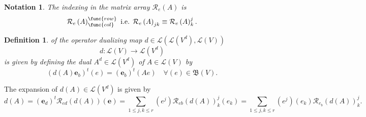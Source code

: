 \documentclass[aps,preprint]{revtex4}
\newtheorem{definition}[theorem]{Definition}
\newtheorem{notation}[theorem]{Notation}
\begin{document}
\begin{notation}
The indexing in the matrix array $\mathcal{R}_{e}\left( A\right) $ is 
\begin{equation}
\mathcal{R}_{e}\left( A\right) _{\func{col}}^{\func{row}}\text{ i.e. }%
\mathcal{R}_{e}\left( A\right) _{jk}\equiv \mathcal{R}_{e}\left( A\right)
_{k}^{j}.
\end{equation}
\end{notation}

\begin{definition}
of the operator dualizing map $d\in \mathcal{L}\left( \mathcal{L}\left(
V^{d}\right) ,\mathcal{L}\left( V\right) \right) $%
\begin{equation}
d:\mathcal{L}\left( V\right) \rightarrow \mathcal{L}\left( V^{d}\right)
\end{equation}%
is given by defining the dual $A^{d}\in \mathcal{L}\left( V^{d}\right) $ of $%
A\in \mathcal{L}\left( V\right) $ by 
\begin{equation}
\left( d\left( A\right) \boldsymbol{e}_{b}\right) ^{t}\left( e\right)
=\left( \boldsymbol{e}_{b}\right) ^{t}\left( Ae\right) \quad \forall \left(
e\right) \in \mathfrak{B}\left( V\right) .
\end{equation}
\end{definition}

The expansion of $d\left( A\right) \in \mathcal{L}\left( V^{d}\right) $ is
given by 
\begin{equation}
d\left( A\right) =\left( \boldsymbol{e}_{d}\right) ^{t}\mathcal{R}%
_{ed}\left( d\left( A\right) \right) \left( \boldsymbol{e}\right)
=\sum_{1\leq j,k\leq r}\left( e^{j}\right) \mathcal{R}_{eb}\left( d\left(
A\right) \right) _{k}^{j}\left( e_{k}\right) =\sum_{1\leq j,k\leq r}\left(
e^{j}\right) \left( e_{k}\right) \mathcal{R}_{e_{b}}\left( d\left( A\right)
\right) _{k}^{j}.
\end{equation}
\end{document}
